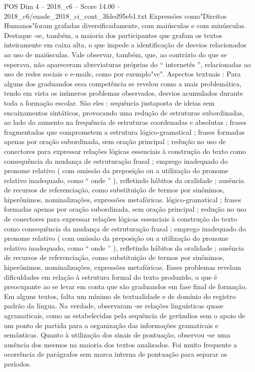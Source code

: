 \begin{textsample}{POS Dim 4 – 2018\_c6 – Score 14.00 – 2018\_c6/enade\_2018\_ci\_cont\_3fded95eb1.txt}
Expressões como"Direitos Humanos"foram grafadas diversificadamente, com maiúsculas e com minúsculas.
Destaque -se, também, a maioria dos participantes que grafam os textos inteiramente em caixa alta, o que impede a identificação de desvios relacionados ao uso de maiúsculas.
Vale observar, também, que, ao contrário do que se esperava, não apareceram abreviaturas próprias do “ internetês ”, relacionadas ao uso de redes sociais e e-mails, como por exemplo"vc".
Aspectos textuais : Para alguns dos graduandos essa competência se revelou como a mais problemática, tendo em vista os inúmeros problemas observados, desvios acumulados durante toda a formação escolar.
São eles : sequência justaposta de ideias sem encaixamentos sintáticos, provocando uma redução de estruturas subordinadas, ao lado do aumento na frequência de estruturas coordenadas e absolutas ; frases fragmentadas que comprometem a estrutura lógico-gramatical ; frases formadas apenas por oração subordinada, sem oração principal ; redução no uso de conectores para expressar relações lógicas essenciais à construção do texto como consequência da mudança de estruturação frasal ; emprego inadequado do pronome relativo ( com omissão da preposição ou a utilização do pronome relativo inadequado, como “ onde ” ), refletindo hábitos da oralidade ; ausência de recursos de referenciação, como substituição de termos por sinônimos, hiperônimos, nominalizações, expressões metafóricas. lógico-gramatical ; frases formadas apenas por oração subordinada, sem oração principal ; redução no uso de conectores para expressar relações lógicas essenciais à construção do texto como consequência da mudança de estruturação frasal ; emprego inadequado do pronome relativo ( com omissão da preposição ou a utilização do pronome relativo inadequado, como “ onde ” ), refletindo hábitos da oralidade ; ausência de recursos de referenciação, como substituição de termos por sinônimos, hiperônimos, nominalizações, expressões metafóricas.
Esses problemas revelam dificuldades em relação à estrutura formal do texto produzido, o que é preocupante ao se levar em conta que são graduandos em fase final de formação.
Em alguns textos, falta um mínimo de textualidade e de domínio do registro padrão da língua.
Na verdade, observaram -se relações linguísticas quase agramaticais, como as estabelecidas pela sequência de gerúndios sem o apoio de um ponto de partida para a organização das informações gramaticais e semânticas.
Quanto à utilização dos sinais de pontuação, observou -se uma ausência dos mesmos na maioria dos textos analisados.
Foi muito frequente a ocorrência de parágrafos sem marca interna de pontuação para separar os períodos.

\end{textsample}
